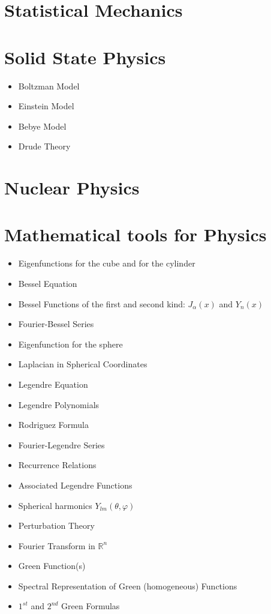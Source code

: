 \documentclass[10pt]{article}
\begin{document}
\section{Statistical Mechanics}
\section{Solid State Physics}
\begin{itemize}
	\item Boltzman Model
	\item Einstein Model
	\item Bebye Model
	\item Drude Theory
\end{itemize}
\section{Nuclear Physics}
\section{Mathematical tools for Physics}
\begin{itemize}
	\item Eigenfunctions for the cube and for the cylinder
	\item Bessel Equation
	\item Bessel Functions of the first and second kind: $ J_{\alpha}(x) $ and $ Y_n(x) $
	\item Fourier-Bessel Series
	\item Eigenfunction for the sphere
	\item Laplacian in Spherical Coordinates
	\item Legendre Equation
	\item Legendre Polynomials
	\item Rodriguez Formula 
	\item Fourier-Legendre Series
	\item Recurrence Relations
	\item Associated Legendre Functions
	\item Spherical harmonics $ Y_{lm}(\theta,\varphi) $
	\item Perturbation Theory
	\item Fourier Transform in $\mathbb{R}^n$
	\item Green Function(s)
	\item Spectral Representation of Green (homogeneous) Functions
	\item $1^{st}$ and $2^{nd}$ Green Formulas
\end{itemize}
\end{document}
